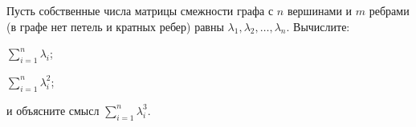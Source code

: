 Пусть собственные числа матрицы смежности графа с $n$ вершинами и $m$ ребрами (в графе нет петель и кратных ребер) равны
$\lambda_1, \lambda_2, \dots, \lambda_n$. Вычислите:
\begin{enumcyr}
    \item $\sum\limits_{i = 1}^n \lambda_i$;
    \item $\sum\limits_{i = 1}^n \lambda_i^2$;
	\item и объясните смысл $\sum\limits_{i = 1}^n \lambda_i^3$.
\end{enumcyr}